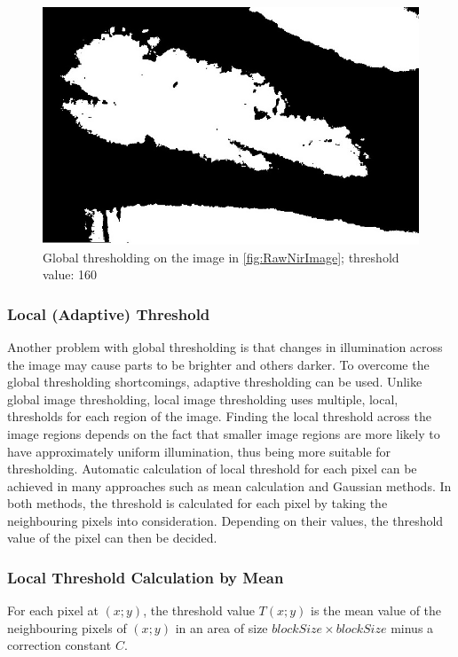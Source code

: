 \begin{figure}[H]
\centering
\includegraphics[scale=0.6]{figures/thresholdGlobal.JPG}
\caption[Global thresholding example]{Global thresholding on the image in \autoref{fig:RawNirImage}; threshold value: 160}\label{fig:thresholdGlobal}
\end{figure}

\subsubsection{Local (Adaptive) Threshold}
Another problem with global thresholding is that changes in illumination across the image may cause parts to be brighter and others darker. To overcome the global thresholding shortcomings, adaptive thresholding can be used. 
Unlike global image thresholding, local image thresholding uses multiple, local, thresholds for each region of the image. Finding the local threshold across the image regions depends on the fact that smaller image regions are more likely to have approximately uniform illumination, thus being more suitable for thresholding. Automatic calculation of local threshold for each pixel can be achieved in many approaches such as mean calculation and Gaussian methods. In both methods, the threshold is calculated for each pixel by taking the neighbouring pixels into consideration. Depending on their values, the threshold value of the pixel can then be decided.

\subsubsection{Local Threshold Calculation by Mean}
For each pixel at $(x; y)$, the threshold value $T(x; y)$ is the mean value of the neighbouring pixels of $(x; y)$ in an area of size $blockSize \times blockSize$ minus a correction constant $C$. 

